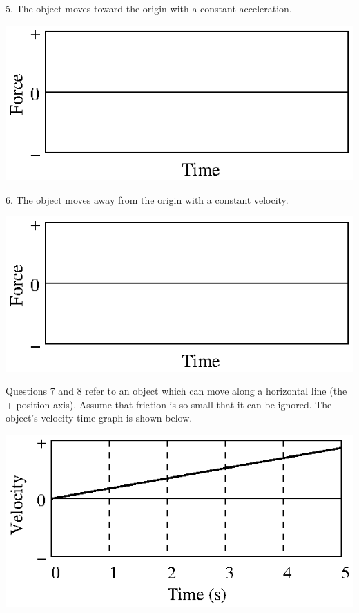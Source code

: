5. The object moves toward the origin with a constant acceleration.

\vspace{0.3cm}
{\par\centering \includegraphics{force1_fig10.eps} \par}
\vspace{0.3cm}

6. The object moves away from the origin with a constant velocity.

\vspace{0.3cm}
{\par\centering \includegraphics{force1_fig10.eps} \par}
\vspace{0.3cm}

Questions 7 and 8 refer to an object which can move along a horizontal line
(the + position axis). Assume that friction is so small that it can be ignored.
The object's velocity-time graph is shown below.

\vspace{0.3cm}
{\par\centering \includegraphics{force1_fig11.eps} \par}
\vspace{0.3cm}

